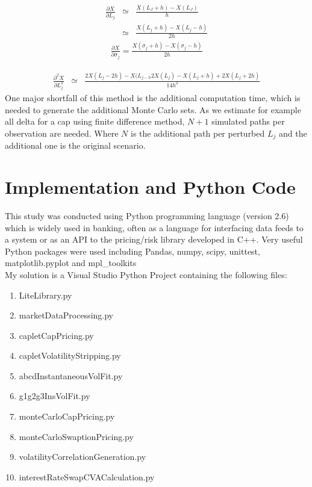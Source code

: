 \documentclass[11pt]{article}
\numberwithin{equation}{subsection}
\begin{document}
\begin{eqnarray*}
	\frac{\partial X}{\partial L_j} &\simeq& \frac{X(L_J + h) - X(L_J)}{h} \\
	&\simeq& \frac{X(L_{j} + h) - X(L_{j} - h)}{2h}
\end{eqnarray*}	
\begin{eqnarray*}
	\frac{\partial X}{\partial \sigma_{j}} = \frac{X(\sigma_{j} + h) - X(\sigma_{j} - h)}{2h}
\end{eqnarray*}

\begin{eqnarray*}
	\frac{\partial^2 X}{\partial L_{j}^2}  &\simeq&  \frac{2X(L_{j} -2h) - X(L_{j-h} 2X (L_{j}) -X(L_{j} + h) + 2X(L_j + 2h)}{14h^2}
\end{eqnarray*}
One major shortfall of this method is the additional computation time, which is needed to generate the additional Monte Carlo sets. As we estimate for example all delta for a cap using finite difference method, \(N+1\) simulated paths per observation are needed. Where \(N\) is the additional path per perturbed \(L_j\) and the additional one is the original scenario.


\newpage
\section{Implementation and Python Code}
This study was conducted using Python programming language (version 2.6) which is widely used in banking, often as a language for interfacing data feeds to a system or as an API to the pricing/risk library developed in C++. Very useful Python packages were used including Pandas, numpy, scipy, unittest, matplotlib.pyplot and mpl\_toolkits\\
My solution is a Visual Studio Python Project containing the following files:
\begin{enumerate}
	\item LiteLibrary.py
	\item marketDataProcessing.py
	\item capletCapPricing.py
	\item capletVolatilityStripping.py
	\item abcdInstantaneousVolFit.py
	\item g1g2g3InsVolFit.py
	\item monteCarloCapPricing.py
	\item monteCarloSwaptionPricing.py
	\item volatilityCorrelationGeneration.py
	\item interestRateSwapCVACalculation.py
\end{enumerate}
\end{document}
